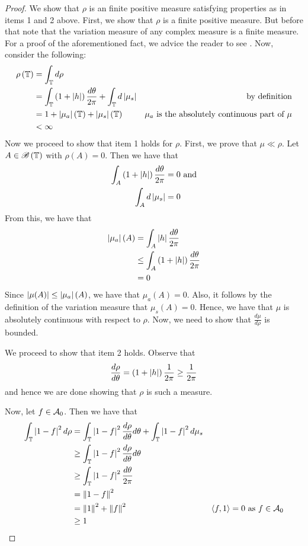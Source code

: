 \begin{proof}
   We show that $\rho$ is an finite positive measure satisfying properties as in items 1 and 2 above. First, we show that $\rho$ is a finite positive measure. But before that note that the variation measure of any complex measure is  a finite measure. For a proof of the aforementioned fact, we advice the reader to see \cite{cohn2013measure}. Now, consider the following:
   \begin{align*}
       \rho\left( \mathbb T \right) &= \int_{\mathbb T} d\rho \\
       &= \int_{\mathbb T} \left( 1+ \left\lvert h \right\rvert \right) \frac{d\theta}{2\pi} + \int_{\mathbb T} d\left\lvert \mu_{s} \right\rvert  & \text{by definition} \\
       &= 1 + \left\lvert \mu_{a} \right\rvert \left( \mathbb T \right) + \left\lvert \mu_{s} \right\rvert \left( \mathbb T \right) & \mu_{a} \text{ is the absolutely continuous part of } \mu \\
       &< \infty
   \end{align*}
   Now we proceed to show that item 1 holds for $\rho$. First, we prove that $\mu \ll \rho$. Let $A \in {\mathscr B} \left( \mathbb T \right)$ with $\rho \left( A \right) = 0$. Then we have that
   \begin{align*}
       \int_{A} \left( 1+ \left\lvert h \right\rvert \right) \frac{d\theta}{2\pi} &=0 \text{ and} \\
       \int_{A} d\left\lvert \mu_{s} \right\rvert &= 0
   \end{align*}
   From this, we have that
   \begin{align*}
       \left\lvert \mu_{a} \right\rvert \left( A \right) &=  \int_{A} \left\lvert h \right\rvert \frac{d\theta}{2\pi} \\
       &\le \int_{A} \left( 1+\left\lvert h \right\rvert  \right)\frac{d\theta}{2\pi} \\
       &= 0
   \end{align*}
   Since $\left\lvert \mu (A) \right\rvert \le \left\lvert \mu_{a} \right\rvert (A)$, we have that $\mu_{a} \left( A \right) = 0$. Also, it follows by the definition of the variation measure that $\mu_s \left( A \right) = 0$. Hence, we have that $\mu $ is absolutely continuous with respect to $\rho$. Now, we need to show that $\frac{d\mu}{d\rho}$ is bounded.


We proceed to show that item 2 holds. Observe that
\begin{align*}
    \frac{d\rho}{d\theta} = \left( 1+\left\lvert h \right\rvert \right) \frac{1}{2\pi} \ge \frac{1}{2\pi}
\end{align*}
and hence we are done showing that $\rho$ is such a measure.

Now, let $f\in {\cal A}_{0}$. Then we have that
\begin{align*}
    \int_{\mathbb T} \left\lvert 1-f \right\rvert^{2} d\rho &= \int_{\mathbb T} \left\lvert 1-f \right\rvert^{2} \frac{d\rho}{d\theta} d\theta + \int_{\mathbb T} \left\lvert 1-f \right\rvert^2 d\mu_{s} \\
    &\ge \int_{\mathbb T} \left\lvert 1-f \right\rvert^{2} \frac{d\rho}{d\theta} d\theta \\
    & \ge \int_{\mathbb T} \left\lvert 1-f \right\rvert^{2} \frac{d\theta}{2\pi} \\ 
    &= \left\lVert 1-f \right\rVert^{2} \\
    &= \left\lVert 1 \right\rVert^{2} + \left\lVert f \right\rVert^{2} & \left\langle f,1 \right\rangle = 0  \text{ as } f\in {\cal A}_{0} \\
&\ge 1 
\end{align*}


\end{proof}
